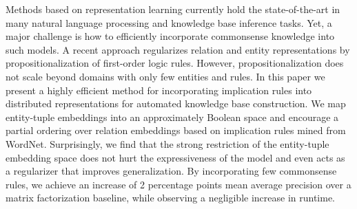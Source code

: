 Methods based on representation learning currently hold the state-of-the-art in many natural language processing and knowledge base inference tasks. Yet, a major challenge is how to efficiently incorporate commonsense knowledge into such models. A recent approach regularizes relation and entity representations by propositionalization of first-order logic rules. However, propositionalization does not scale beyond domains with only few entities and rules. In this paper we present a highly efficient method for incorporating implication rules into distributed representations for automated knowledge base construction. We map entity-tuple embeddings into an approximately Boolean space and encourage a partial ordering over relation embeddings based on implication rules mined from WordNet. Surprisingly, we find that the strong restriction of the entity-tuple embedding space does not hurt the expressiveness of the model and even acts as a regularizer that improves generalization. By incorporating few commonsense rules, we achieve an increase of 2 percentage points mean average precision over a matrix factorization baseline, while observing a  negligible increase in runtime.
